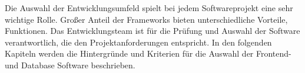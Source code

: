 
\begin{spacing}{1}  
\end{spacing}
Die Auswahl der Entwicklungsumfeld spielt bei jedem Softwareprojekt eine sehr
wichtige Rolle. Großer Anteil der Frameworks bieten unterschiedliche Vorteile,
Funktionen. 
Das Entwicklungsteam ist für die Prüfung und Auswahl der Software verantwortlich,
die den Projektanforderungen entspricht. In den folgenden Kapiteln werden
die Hintergründe und Kriterien für die Auswahl der Frontend-und Database Software
beschrieben. 
